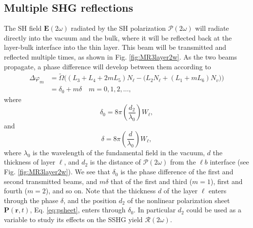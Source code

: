 
\subsection{Multiple SHG reflections}

The SH field $\mathbf{E}(2\omega)$ radiated by the SH polarization
$\boldsymbol{\mathcal{P}}(2\omega)$ will radiate directly into the vacuum and
the bulk, where it will be reflected back at the layer-bulk interface into the
thin layer. This beam will be transmitted and reflected multiple times, as shown
in Fig. \ref{fig:MR3layer2w}. As the two beams propagate, a phase difference
will develop between them according to
\begin{equation}\label{eq:m99}
\begin{split}
\Delta\varphi_{m} 
&= \tilde{\Omega}
\Big(
(L_{3} + L_{4} + 2mL_{5})N_{\ell}
 - \big(L_{2}N_{\ell} + (L_{1} + mL_{6})N_{v}\big)
\Big)\\
&= \delta_{0} + m\delta\quad m=0,1,2,\ldots,
\end{split}
\end{equation}
where
\begin{equation}\label{delta0}
\delta_{0} =
8\pi\left(\frac{d_{2}}{\lambda_{0}}\right)W_{\ell},
\end{equation}
and
\begin{equation}\label{delta}
\delta = 8\pi
\left(\frac{d}{\lambda_{0}}\right)W_{\ell},
\end{equation}
where $\lambda_{0}$ is the wavelength of the fundamental field in the vacuum,
$d$ the thickness of layer $\ell$, and $d_{2}$ is the distance of
$\boldsymbol{\mathcal{P}}(2\omega)$ from the $\ell b$ interface (see Fig.
\ref{fig:MR3layer2w}). We see that $\delta_{0}$ is the phase difference of the
first and second transmitted beams, and $m\delta$ that of the first and third
($m = 1$), first and fourth ($m = 2$), and so on. Note that the thickness $d$ of
the layer $\ell$ enters through the phase $\delta$, and the position $d_{2}$ of
the nonlinear polarization sheet $\mathbf{P}(\mathbf{r},t)$, Eq.
\eqref{eq:psheet}, enters through $\delta_{0}$. In particular $d_{2}$ could be
used as a variable to study its effects on the SSHG yield
$\mathcal{R}(2\omega)$.


